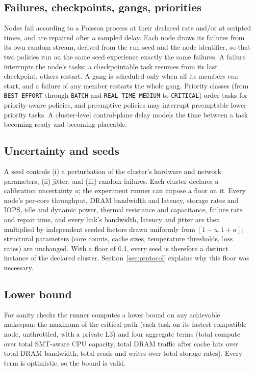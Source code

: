 \documentclass[12pt,a4paper]{report}
\begin{document}
\subsection{Failures, checkpoints, gangs, priorities}

Nodes fail according to a Poisson process at their declared rate and/or
at scripted times, and are repaired after a sampled delay. Each node draws
its failures from its own random stream, derived from the run seed and the
node identifier, so that two policies run on the same seed experience
exactly the same failures. A failure interrupts the node's tasks; a
checkpointable task resumes from its last checkpoint, others restart. A
gang is scheduled only when all its members can start, and a failure of
any member restarts the whole gang. Priority classes (from
\texttt{BEST\_EFFORT} through \texttt{BATCH} and \texttt{REAL\_TIME\_MEDIUM}
to \texttt{CRITICAL}) order tasks
for priority-aware policies, and preemptive policies may interrupt
preemptable lower-priority tasks. A cluster-level control-plane delay
models the time between a task becoming ready and becoming placeable.

\subsection{Uncertainty and seeds}

A seed controls (i) a perturbation of the cluster's hardware and network
parameters, (ii) jitter, and (iii) random failures. Each cluster declares a
calibration uncertainty $u$; the experiment runner can impose a floor on
it. Every node's per-core throughput, DRAM bandwidth and latency, storage
rates and IOPS, idle and dynamic power, thermal resistance and
capacitance, failure rate and repair time, and every link's bandwidth,
latency and jitter are then multiplied by independent seeded factors drawn
uniformly from $[1-u, 1+u]$; structural parameters (core counts, cache
sizes, temperature thresholds, loss rates) are unchanged. With a floor of
0.1, every seed is therefore a distinct instance of the declared cluster.
Section~\ref{sec:protocol} explains why this floor was necessary.

\subsection{Lower bound}

For sanity checks the runner computes a lower bound on any achievable
makespan: the maximum of the critical path (each task on its fastest
compatible node, unthrottled, with a private L3) and four aggregate terms
(total compute over total SMT-aware CPU capacity, total DRAM traffic after
cache hits over total DRAM bandwidth, total reads and writes over total
storage rates). Every term is optimistic, so the bound is valid.
\end{document}
